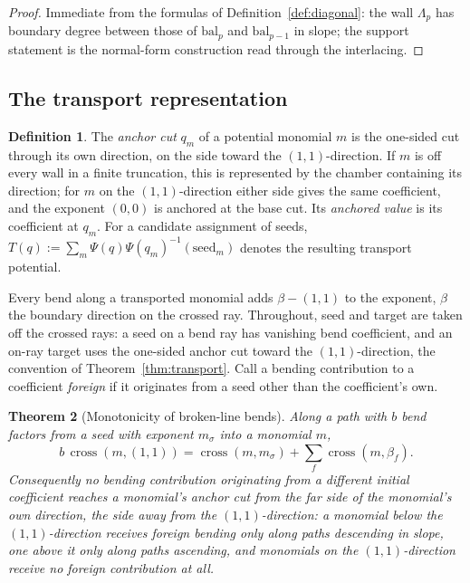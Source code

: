 \documentclass[11pt]{amsart}
\newtheorem{theorem}{Theorem}[section]
\theoremstyle{definition}
\newtheorem{definition}[theorem]{Definition}
\theoremstyle{remark}
\begin{document}
\begin{proof}
Immediate from the formulas of Definition~\ref{def:diagonal}: the wall
$\Lambda_{p}$ has boundary degree between those of $\mathrm{bal}_{p}$ and
$\mathrm{bal}_{p-1}$ in slope; the support statement is the normal-form
construction read through the interlacing.
\end{proof}



\subsection{The transport representation}
\label{ssec:transport}

\begin{definition}
\label{def:anchor}
The \emph{anchor cut} $q_m$ of a potential monomial $m$ is the one-sided cut
through its own direction, on the side toward the $(1,1)$-direction. If $m$ is
off every wall in a finite truncation, this is represented by the chamber
containing its direction; for $m$ on the $(1,1)$-direction either side gives the
same coefficient, and the exponent $(0,0)$ is anchored at the base cut. Its
\emph{anchored value} is its coefficient at $q_m$. For a
candidate assignment of seeds,
$T(q):=\sum_{m}\Psi(q)\Psi(q_m)^{-1}(\mathrm{seed}_{m})$ denotes the resulting
transport potential.
\end{definition}

Every bend along a transported monomial adds $\beta-(1,1)$ to the exponent,
$\beta$ the boundary direction on the crossed ray. Throughout, seed and
target are taken off the crossed rays: a seed on a bend ray has vanishing
bend coefficient, and an on-ray target uses the one-sided anchor cut toward
the $(1,1)$-direction, the convention of Theorem~\ref{thm:transport}. Call a
bending contribution to a coefficient \emph{foreign} if it originates from a
seed other than the coefficient's own.

\begin{theorem}[Monotonicity of broken-line bends]
\label{thm:nobackscatter}
Along a path with $b$ bend factors from a seed with exponent $m_{\sigma}$
into a monomial $m$,
\[
b\,\operatorname{cross}(m,(1,1))
=\operatorname{cross}(m,m_{\sigma})+\sum_{f}\operatorname{cross}(m,\beta_{f}).
\]
Consequently no bending contribution originating from a different initial
coefficient reaches a monomial's anchor cut from the far
side of the monomial's own direction, the side away from the
$(1,1)$-direction: a monomial below the $(1,1)$-direction receives foreign
bending only along paths descending in slope, one above it only along paths
ascending, and monomials on the $(1,1)$-direction
receive no foreign contribution at all.
\end{theorem}
\end{document}
